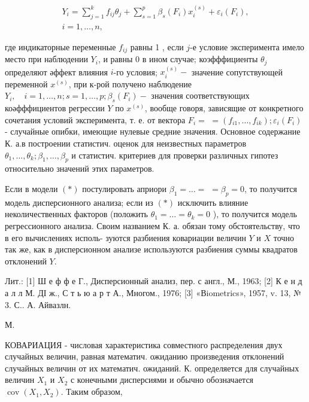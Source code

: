 \documentclass[10pt]{article}
\begin{document}
\[

\begin{gathered}

Y_{i}=\sum_{j=1}^{k} f_{i j} \theta_{j}+\sum_{s=1}^{p} \beta_{s}\left(F_{i}\right) x_{i}^{(s)}+\varepsilon_{i}\left(F_{i}\right), \\

i=1, \ldots, n,

\end{gathered}

\]



где индикаторные переменные $f_{i j}$ равны 1 , если $j$-е условие эксперимента имело место при наблюдении $Y_{i}$, и равны 0 в ином случае; коэфффициенты $\theta_{j}$ определяют әффект влияния $i$-го условия; $x_{i}^{(s)}-$ значение сопутствующей переменной $x^{(s)}$, при к-рой получено наблюдение $Y_{i}, \quad i=1, \ldots, n ; s=1, \ldots, p ; \beta_{s}\left(F_{i}\right)-$ значения соответствующих коәфффициентов регрессии $Y$ по $x^{(s)}$, вообще говоря, зависящие от конкретного сочетания условий эксперимента, т. е. от вектора $F_{i}=$ $=\left(f_{i 1}, \ldots, f_{i k}\right) ; \varepsilon_{i}\left(F_{i}\right)$ - случайные опибки, имеющие нулевые средние значения. Основное содержание К. а.в построении статистич. оценок для неизвестных параметров $\theta_{1}, \ldots, \theta_{k} ; \beta_{1}, \ldots, \beta_{p}$ и статистич. критериев для проверки различных гипотез относительно значений этих параметров.



Если в модели $(*)$ постулировать априори $\beta_{1}=\ldots=$ $=\beta_{p}=0$, то получится модель дисперсионного анализа; если из $(*)$ исключить влияние неколичественных факторов (положить $\theta_{1}=\ldots=\theta_{k}=0$ ), то получится модель регрессионного анализа. Своим названием К. а. обязан тому обстоятельству, что в его вычислениях исполь- зуются разбиения ковариации величин $Y$ и $X$ точно так же, как в дисперсионном анализе используются разбиения суммы квадратов отклонений $Y$.



Лит.: [1] Ш е ф ф е Г., Дисперсионный анализ, пер. с англ., М., 1963; [2] К е н д а л л М. ДІ ж., С т ь ю а р т А., Многом., 1976; [3] «Вiometrics», 1957, v. 13, № 3. С.. А. Айвазлн.

М.



КОВАРИАЦИЯ - числовая характеристика совместного распределения двух случайных величин, равная математич. ожиданию произведения отклонений случайных величин от их математич. ожиданий. $К$. определяется для случайных величин $X_{1}$ и $X_{2}$ с конечными дисперсиями и обычно обозначается $\operatorname{cov}\left(X_{1}, X_{2}\right)$. Таким образом,
\end{document}
